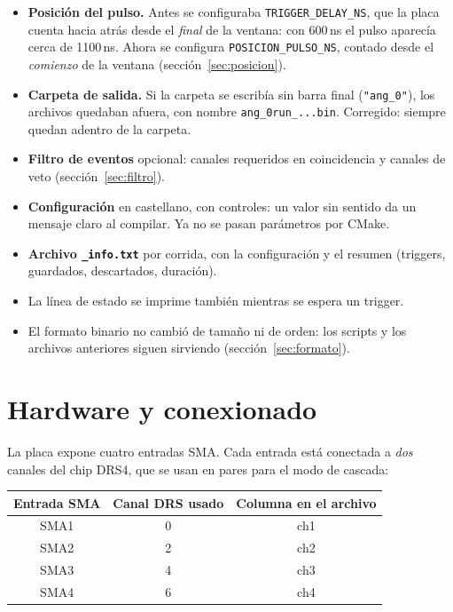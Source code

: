 \documentclass[11pt,a4paper]{article}
\newcommand{\code}[1]{\texttt{#1}}
\begin{document}
\begin{itemize}[itemsep=2pt]
  \item \textbf{Posición del pulso.} Antes se configuraba \code{TRIGGER\_DELAY\_NS},
        que la placa cuenta hacia atrás desde el \emph{final} de la ventana: con
        600\,ns el pulso aparecía cerca de 1100\,ns. Ahora se configura
        \code{POSICION\_PULSO\_NS}, contado desde el \emph{comienzo} de la ventana
        (sección~\ref{sec:posicion}).
  \item \textbf{Carpeta de salida.} Si la carpeta se escribía sin barra final
        (\code{"ang\_0"}), los archivos quedaban afuera, con nombre
        \code{ang\_0run\_...bin}. Corregido: siempre quedan adentro de la carpeta.
  \item \textbf{Filtro de eventos} opcional: canales requeridos en coincidencia y
        canales de veto (sección~\ref{sec:filtro}).
  \item \textbf{Configuración} en castellano, con controles: un valor sin sentido da
        un mensaje claro al compilar. Ya no se pasan parámetros por CMake.
  \item \textbf{Archivo \code{\_info.txt}} por corrida, con la configuración y el
        resumen (triggers, guardados, descartados, duración).
  \item La línea de estado se imprime también mientras se espera un trigger.
  \item El formato binario no cambió de tamaño ni de orden: los scripts y los
        archivos anteriores siguen sirviendo (sección~\ref{sec:formato}).
\end{itemize}

\section{Hardware y conexionado}

La placa expone cuatro entradas SMA. Cada entrada está conectada a \emph{dos} canales
del chip DRS4, que se usan en pares para el modo de cascada:

\begin{center}
\begin{tabular}{ccc}
\toprule
Entrada SMA & Canal DRS usado & Columna en el archivo \\
\midrule
SMA1 & 0 & ch1 \\
SMA2 & 2 & ch2 \\
SMA3 & 4 & ch3 \\
SMA4 & 6 & ch4 \\
\bottomrule
\end{tabular}
\end{center}
\end{document}
